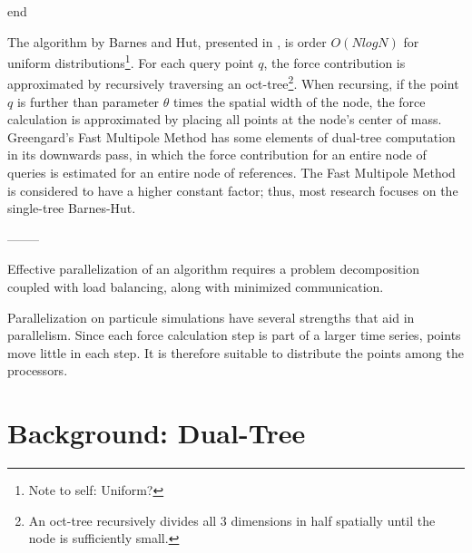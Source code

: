 \documentclass[times, 10pt,twocolumn]{article}
\newcommand{\authornote}[1]{\footnote{Note to self: #1}}
\begin{document}
end

The algorithm by Barnes and Hut, presented in \cite{barneshut}, is order $O(N log N)$ for uniform distributions\authornote{Uniform?}.
For each query point $q$, the force contribution is approximated by recursively traversing an oct-tree\footnote{An oct-tree recursively divides all 3 dimensions in half spatially until the node is sufficiently small.}.
When recursing, if the point $q$ is further than parameter $\theta$ times the spatial width of the node, the force calculation is approximated by placing all points at the node's center of mass.
Greengard's Fast Multipole Method \cite{greengard_fmm} has some elements of dual-tree computation in its downwards pass, in which the force contribution for an entire node of queries is estimated for an entire node of references.
The Fast Multipole Method is considered to have a higher constant factor; thus, most research focuses on the single-tree Barnes-Hut\cite{fmm_slower}.

--------

Effective parallelization of an algorithm requires a problem decomposition coupled with load balancing, along with minimized communication.

Parallelization on particule simulations have several strengths that aid in parallelism.
Since each force calculation step is part of a larger time series, points move little in each step.
It is therefore suitable to distribute the points among the processors.


\section{Background: Dual-Tree}
\end{document}
